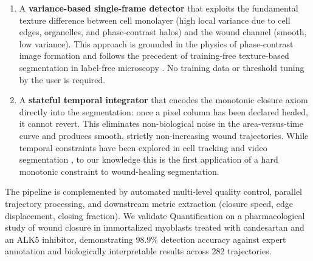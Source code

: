 \begin{enumerate}[leftmargin=2em]

  \item A \textbf{variance-based single-frame detector} that exploits the fundamental texture
    difference between cell monolayer (high local variance due to cell edges, organelles, and
    phase-contrast halos) and the wound channel (smooth, low variance).
    This approach is grounded in the physics of phase-contrast image formation
    \citep{Yin2012} and follows the precedent of training-free texture-based segmentation
    in label-free microscopy \citep{Ambrossio2022,Vicar2019}.
    No training data or threshold tuning by the user is required.

  \item A \textbf{stateful temporal integrator} that encodes the monotonic closure axiom
    directly into the segmentation: once a pixel column has been declared healed, it cannot
    revert.
    This eliminates non-biological noise in the area-versus-time curve and produces smooth,
    strictly non-increasing wound trajectories.
    While temporal constraints have been explored in cell tracking
    \citep{Bragantini2025,Lee2023,Li2008} and video segmentation \citep{Guan2021},
    to our knowledge this is the first application of a hard monotonic constraint to
    wound-healing segmentation.

\end{enumerate}

The pipeline is complemented by automated multi-level quality control, parallel trajectory
processing, and downstream metric extraction (closure speed, edge displacement, closing
fraction).
We validate Quantification on a pharmacological study of wound closure in immortalized
myoblasts treated with candesartan and an ALK5 inhibitor, demonstrating 98.9\% detection
accuracy against expert annotation and biologically interpretable results across 282
trajectories.
